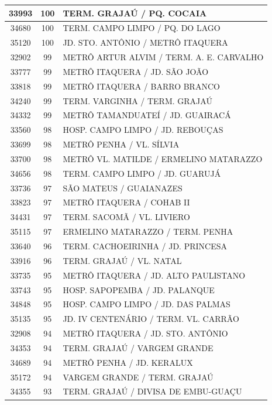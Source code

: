 \documentclass[
	12pt,				%
	oneside,			%
	a4paper,			%
	english,			%
	brazil				%
	]{abntex2ppgsi}
\begin{document}
{{\begin{apendicesenv}
\begin{longtable}{c|c|p{7cm}}
 \hline 
33993 &	100 &	TERM. GRAJAÚ / PQ. COCAIA \\ 
 \hline 
34680 &	100 &	TERM. CAMPO LIMPO / PQ. DO LAGO \\ 
 \hline 
35120 &	100 &	JD. STO. ANTÔNIO / METRÔ ITAQUERA \\ 
 \hline 
32902 &	99 &	METRÔ ARTUR ALVIM / TERM. A. E. CARVALHO \\ 
 \hline 
33777 &	99 &	METRÔ ITAQUERA / JD. SÃO JOÃO \\ 
 \hline 
33818 &	99 &	METRÔ ITAQUERA / BARRO BRANCO \\ 
 \hline 
34240 &	99 &	TERM. VARGINHA / TERM. GRAJAÚ \\ 
 \hline 
34332 &	99 &	METRÔ TAMANDUATEÍ / JD. GUAIRACÁ \\ 
 \hline 
33560 &	98 &	HOSP. CAMPO LIMPO / JD. REBOUÇAS \\ 
 \hline 
33699 &	98 &	METRÔ PENHA / VL. SÍLVIA \\ 
 \hline 
33700 &	98 &	METRÔ VL. MATILDE / ERMELINO MATARAZZO \\ 
 \hline 
34656 &	98 &	TERM. CAMPO LIMPO / JD. GUARUJÁ \\ 
 \hline 
33736 &	97 &	SÃO MATEUS / GUAIANAZES \\ 
 \hline 
33823 &	97 &	METRÔ ITAQUERA / COHAB II \\ 
 \hline 
34431 &	97 &	TERM. SACOMÃ / VL. LIVIERO \\ 
 \hline 
35115 &	97 &	ERMELINO MATARAZZO / TERM. PENHA \\ 
 \hline 
33640 &	96 &	TERM. CACHOEIRINHA / JD. PRINCESA \\ 
 \hline 
33916 &	96 &	TERM. GRAJAÚ / VL. NATAL \\ 
 \hline 
33735 &	95 &	METRÔ ITAQUERA / JD. ALTO PAULISTANO \\ 
 \hline 
33743 &	95 &	HOSP. SAPOPEMBA / JD. PALANQUE \\ 
 \hline 
34848 &	95 &	HOSP. CAMPO LIMPO / JD. DAS PALMAS \\ 
 \hline 
35135 &	95 &	JD. IV CENTENÁRIO / TERM. VL. CARRÃO \\ 
 \hline 
32908 &	94 &	METRÔ ITAQUERA / JD. STO. ANTÔNIO \\ 
 \hline 
34353 &	94 &	TERM. GRAJAÚ / VARGEM GRANDE \\ 
 \hline 
34689 &	94 &	METRÔ PENHA / JD. KERALUX \\ 
 \hline 
35172 &	94 &	VARGEM GRANDE / TERM. GRAJAÚ \\ 
 \hline 
34355 &	93 &	TERM. GRAJAÚ / DIVISA DE EMBU-GUAÇU \\ 

\end{longtable}
\end{apendicesenv}}}
\end{document}
